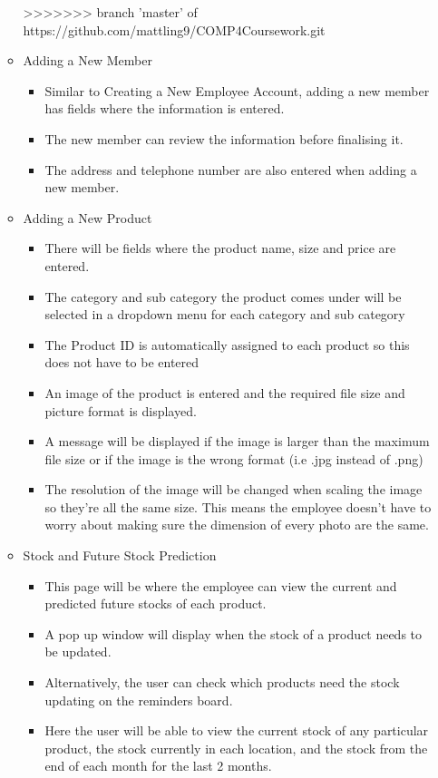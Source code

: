 \begin{itemize}
\begin{itemize}
\pagebreak
>>>>>>> branch 'master' of https://github.com/mattling9/COMP4Coursework.git

	\item Adding a New Member
	\begin{itemize}
		\item Similar to Creating a New Employee Account, adding a new member has fields where the information is entered.
		\item The new member can review the information before finalising it.
		\item The address and telephone number are also entered when adding a new member.
	\end{itemize}

	\item{Adding a New Product}
	\begin{itemize}
		\item There will be fields where the product name, size and price are entered.
		\item The category and sub category the product comes under will be selected in a dropdown menu for each category and sub category
		\item The Product ID is automatically assigned to each product so this does not have to be entered
		\item An image of the product is entered and the required file size and picture format is displayed.
		\item A message will be displayed if the image is larger than the maximum file size or if the image is the wrong format (i.e .jpg instead of .png)
		\item The resolution of the image will be changed when scaling the image so they’re all the same size. This means the employee doesn’t have to worry about making sure the dimension of every photo are the same.
	\end{itemize}



	\item Stock and Future Stock Prediction
	\begin{itemize}
		\item This page will be where the employee can view the current and predicted future stocks of each product.
		\item A pop up window will display when the stock of a product needs to be updated.
		\item Alternatively, the user can check which products need the stock updating on the reminders board.
		\item Here the user will be able to view the current stock of any particular product, the stock currently in each location, and the stock from the end of each month for the last 2 months.
	\end{itemize}
\end{itemize}


\end{itemize}

